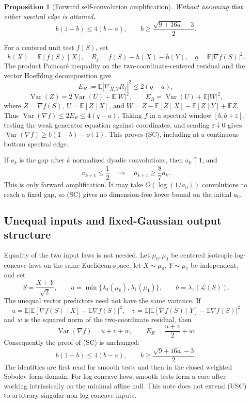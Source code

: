 \documentclass[11pt]{article}
\newtheorem{proposition}[theorem]{Proposition}
\theoremstyle{definition}
\theoremstyle{remark}
\newcommand{\E}{\mathbb E}
\newcommand{\Var}{\operatorname{Var}}
\newcommand{\1}{\mathbf 1}
\begin{document}
\begin{proposition}[Forward self-convolution amplification]
Without assuming that either spectral edge is attained,
\[
 \boxed{\qquad
 b(1-b)\le4(b-a),\qquad
 b\ge\frac{\sqrt{9+16a}-3}{2}.
 \qquad}                                              \tag{SC}
\]
\end{proposition}

For a centered unit test \(f(S)\), set
\[
 h(X)=\E[f(S)\mid X],\quad
 R_f=f(S)-h(X)-h(Y),\quad q=\E|\nabla f(S)|^2.
\]
The product Poincar\'e inequality on the two-coordinate-centered residual
and the vector Hoeffding decomposition give
\[
 E_R:=\E|\nabla_{X,Y}R_f|^2\le2(q-a),                \tag{10.1}
\]
\[
 \Var(Z)=2\Var(U)+\E|W|^2,\qquad
 E_R=\Var(U)+\E|W|^2,                                \tag{10.2}
\]
where \(Z=\nabla f(S)\), \(U=\E[Z\mid X]\), and
\(W=Z-\E[Z\mid X]-\E[Z\mid Y]+\E Z\).  Thus
\(\Var(\nabla f)\le2E_R\le4(q-a)\).  Taking \(f\) in a
spectral window \([b,b+\varepsilon]\), testing the weak generator equation
against coordinates, and sending \(\varepsilon\downarrow0\) gives
\(\Var(\nabla f)\ge b(1-b)-o(1)\).  This proves (SC), including at a
continuous bottom spectral edge.

If \(a_k\) is the gap after \(k\) normalized dyadic convolutions, then
\(a_k\uparrow1\), and
\[
 a_{k+1}\le\frac12\quad\Longrightarrow\quad
 a_{k+1}\ge\frac87a_k.                               \tag{10.3}
\]
This is only forward amplification.  It may take
\(O(\log(1/a_0))\) convolutions to reach a fixed gap, so (SC) gives no
dimension-free lower bound on the initial \(a_0\).

\subsection{Unequal inputs and fixed-Gaussian output structure}

Equality of the two input laws is not needed.  Let \(\mu_0,\mu_1\) be
centered isotropic log-concave laws on the same Euclidean space, let
\(X\sim\mu_0\), \(Y\sim\mu_1\) be independent, and set
\[
 S=\frac{X+Y}{\sqrt2},\qquad
 a=\min\{\lambda_1(\mu_0),\lambda_1(\mu_1)\},\qquad
 b=\lambda_1(\mathcal L(S)).
\]
The unequal vector predictors need not have the same variance.  If
\[
 u=\E|\E[\nabla f(S)\mid X]-\E\nabla f(S)|^2,\quad
 v=\E|\E[\nabla f(S)\mid Y]-\E\nabla f(S)|^2
\]
and \(w\) is the squared norm of the two-coordinate residual, then
\[
 \Var(\nabla f)=u+v+w,\qquad
 E_R=\frac{u+v}{2}+w.
\]
Consequently the proof of (SC) is unchanged:
\[
 \boxed{\qquad
 b(1-b)\le4(b-a),\qquad
 b\ge\frac{\sqrt{9+16a}-3}{2}.
 \qquad}                                              \tag{USC}
\]
The identities are first read for smooth tests and then in the closed
weighted Sobolev form domain.  For log-concave laws, smooth tests form a
core after working intrinsically on the minimal affine hull.  This note
does not extend (USC) to arbitrary singular non-log-concave inputs.
\end{document}
